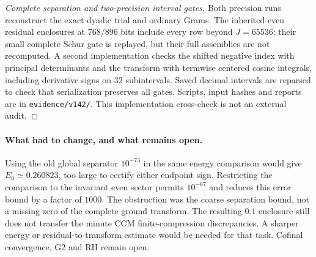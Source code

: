 \begin{proof}[Complete separation and two-precision interval gates]
Both precision runs reconstruct the exact dyadic trial and ordinary
Grams. The inherited even residual enclosures at $768/896$ bits
include every row beyond $J=65536$; their small complete Schur gate
is replayed, but their full assemblies are not recomputed.
A second implementation checks the shifted negative index with
principal determinants and the transform with termwise centered
cosine integrals, including derivative signs on $32$ subintervals.
Saved decimal intervals are reparsed to check that serialization
preserves all gates. Scripts, input hashes and reports are in
\texttt{evidence/v142/}. This implementation cross-check is not an
external audit.
\end{proof}

\paragraph{What had to change, and what remains open.}
Using the old global separator $10^{-73}$ in the same energy comparison
would give $E_0\simeq0.260823$, too large to certify either endpoint
sign. Restricting the comparison to the invariant even sector permits
$10^{-67}$ and reduces this error bound by a factor of $1000$.
The obstruction was the coarse separation bound, not a missing zero
of the complete ground transform. The resulting $0.1$ enclosure
still does not transfer the minute CCM finite-compression discrepancies.
A sharper energy or residual-to-transform estimate would be needed
for that task. Cofinal convergence, G2 and RH remain open.

